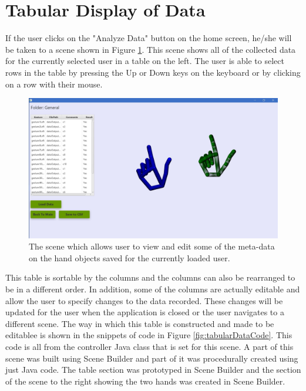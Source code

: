 \section{Tabular Display of Data}
If the user clicks on the "Analyze Data" button on the home screen, he/she will be taken to a scene shown in Figure \ref{fig:analyzeData}. This scene shows all of the collected data for the currently selected user in a table on the left. The user is able to select rows in the table by pressing the Up or Down keys on the keyboard or by clicking on a row with their mouse. 
\begin{figure}[H]
\centering
\includegraphics[scale=0.45]{Figures/6_analyzeScreen.JPG}
\caption[Analyze Data Scene]{The scene which allows user to view and edit some of the meta-data on the hand objects saved for the currently loaded user.}
\label{fig:analyzeData}
\end{figure}
This table is sortable by the columns and the columns can also be rearranged to be in a different order. In addition, some of the columns are actually editable and allow the user to specify changes to the data recorded. These changes will be updated for the user when the application is closed or the user navigates to a different scene. The way in which this table is constructed and made to be editablee is shown in the snippets of code in Figure \ref{fig:tabularDataCode}. This code is all from the controller Java class that is set for this scene. A part of this scene was built using Scene Builder and part of it was procedurally created using just Java code. The table section was prototyped in Scene Builder and the section of the scene to the right showing the two hands was created in Scene Builder.

